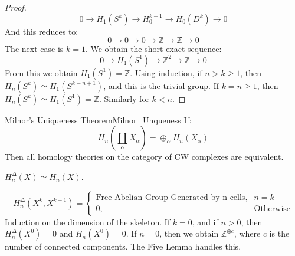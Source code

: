 \documentclass{book}                                                           %
\begin{document}
\begin{proof}
                \begin{equation}
                    0\longrightarrow{H}_{1}(S^{k})\longrightarrow
                    H_{0}^{k-1}\longrightarrow{H}_{0}(D^{k})\longrightarrow{0}
                \end{equation}
                And this reduces to:
                \begin{equation}
                    0\longrightarrow0\longrightarrow0\longrightarrow
                    \mathbb{Z}\longrightarrow\mathbb{Z}\longrightarrow0
                \end{equation}
                The next case is $k=1$. We obtain the short exact sequence:
                \begin{equation}
                    0\longrightarrow{H}_{1}(S^{1})\longrightarrow
                    \mathbb{Z}^{2}\longrightarrow\mathbb{Z}\longrightarrow0
                \end{equation}
                From this we obtain $H_{1}(S^{1})=\mathbb{Z}$. Using induction,
                if $n>k\geq{1}$, then $H_{n}(S^{k})\simeq{H}_{1}(S^{k-n+1})$,
                and this is the trivial group. If $k=n\geq{1}$, then
                $H_{n}(S^{k})\simeq{H}_{1}(S^{1})=\mathbb{Z}$. Similarly for
                $k<n$.
            \end{proof}
            \begin{ltheorem}{Milnor's Uniqueness Theorem}{Milnor_Unqueness}
                If:
                \begin{equation}
                    H_{n}(\coprod_{\alpha}X_{\alpha})
                    =\oplus_{\alpha}H_{n}(X_{\alpha})
                \end{equation}
                Then all homology theories on the category of CW complexes
                are equivalent.
            \end{ltheorem}
            \begin{theorem}
                $H_{n}^{\Delta}(X)\simeq{H}_{n}(X)$.
            \end{theorem}
            \begin{equation}
                H_{n}^{\Delta}(X^{k},X^{k-1})=
                \begin{cases}
                    \textrm{Free Abelian Group Generated by n-cells},&n=k\\
                    0,&\textrm{Otherwise}
                \end{cases}
            \end{equation}
            Induction on the dimension of the skeleton. If $k=0$, and if
            $n>0$, then $H_{n}^{\Delta}(X^{0})=0$ and $H_{n}(X^{0})=0$. If
            $n=0$, then we obtain $\mathbb{Z}^{\oplus{c}}$, where $c$ is the
            number of connected components. The Five Lemma handles this.
\end{document}
